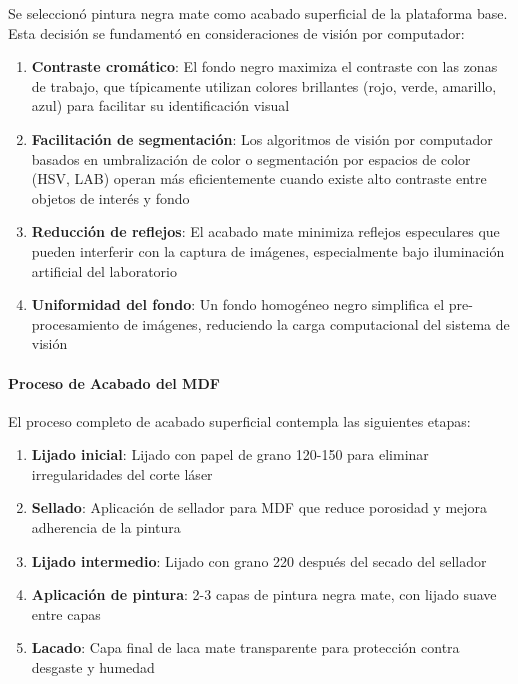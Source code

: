 Se seleccionó pintura negra mate como acabado superficial de la plataforma base. Esta decisión se fundamentó en consideraciones de visión por computador:

\begin{enumerate}
    \item \textbf{Contraste cromático}: El fondo negro maximiza el contraste con las zonas de trabajo, que típicamente utilizan colores brillantes (rojo, verde, amarillo, azul) para facilitar su identificación visual
    
    \item \textbf{Facilitación de segmentación}: Los algoritmos de visión por computador basados en umbralización de color o segmentación por espacios de color (HSV, LAB) operan más eficientemente cuando existe alto contraste entre objetos de interés y fondo
    
    \item \textbf{Reducción de reflejos}: El acabado mate minimiza reflejos especulares que pueden interferir con la captura de imágenes, especialmente bajo iluminación artificial del laboratorio
    
    \item \textbf{Uniformidad del fondo}: Un fondo homogéneo negro simplifica el pre-procesamiento de imágenes, reduciendo la carga computacional del sistema de visión
\end{enumerate}

\paragraph{Proceso de Acabado del MDF}

El proceso completo de acabado superficial contempla las siguientes etapas:

\begin{enumerate}
    \item \textbf{Lijado inicial}: Lijado con papel de grano 120-150 para eliminar irregularidades del corte láser
    \item \textbf{Sellado}: Aplicación de sellador para MDF que reduce porosidad y mejora adherencia de la pintura
    \item \textbf{Lijado intermedio}: Lijado con grano 220 después del secado del sellador
    \item \textbf{Aplicación de pintura}: 2-3 capas de pintura negra mate, con lijado suave entre capas
    \item \textbf{Lacado}: Capa final de laca mate transparente para protección contra desgaste y humedad
\end{enumerate}

